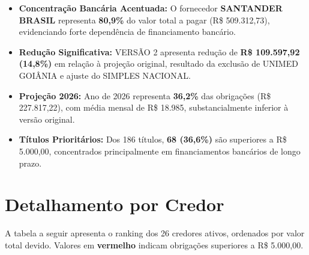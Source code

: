 \documentclass[12pt, a4paper]{article}
\newcommand{\reais}[1]{R\$ #1}
\begin{document}
\begin{itemize}
    \item \textbf{Concentração Bancária Acentuada:} O fornecedor \textbf{SANTANDER BRASIL} representa \textbf{80,9\%} do valor total a pagar (\reais{509.312,73}), evidenciando forte dependência de financiamento bancário.

    \item \textbf{Redução Significativa:} VERSÃO 2 apresenta redução de \textbf{R\$ 109.597,92 (14,8\%)} em relação à projeção original, resultado da exclusão de UNIMED GOIÂNIA e ajuste do SIMPLES NACIONAL.

    \item \textbf{Projeção 2026:} Ano de 2026 representa \textbf{36,2\%} das obrigações (\reais{227.817,22}), com média mensal de R\$ 18.985, substancialmente inferior à versão original.

    \item \textbf{Títulos Prioritários:} Dos 186 títulos, \textbf{68 (36,6\%)} são superiores a R\$ 5.000,00, concentrados principalmente em financiamentos bancários de longo prazo.
\end{itemize}

\newpage

\section{Detalhamento por Credor}

A tabela a seguir apresenta o ranking dos 26 credores ativos, ordenados por valor total devido. Valores em \textcolor{accentColor}{\textbf{vermelho}} indicam obrigações superiores a R\$ 5.000,00.
\end{document}
